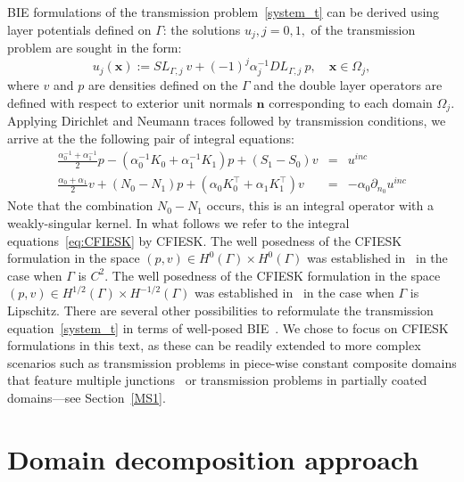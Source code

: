 \documentclass[11pt]{article}
\numberwithin{equation}{section}
\begin{document}
BIE formulations of the transmission problem~\eqref{system_t} can be derived using layer potentials defined on $\Gamma$: the solutions $u_j,j=0,1,$ of the transmission problem are sought in the form:
\begin{equation}\label{eq:layer_t}
  u_j(\mathbf{x}):=SL_{\Gamma,j}\ v+(-1)^j\alpha_j^{-1} DL_{\Gamma,j}\ p,\quad \mathbf{x}\in\Omega_j,
\end{equation}
where $v$ and $p$ are densities defined on the $\Gamma$ and the double layer operators are defined with respect to exterior unit normals $\mathbf{n}$ corresponding to each domain $\Omega_j$. Applying Dirichlet and Neumann traces followed by transmission conditions, we arrive at the the following pair of integral equations:
\begin{equation}\label{eq:CFIESK}
\begin{array}{rcl}
\frac{\alpha_0^{-1}+\alpha_1^{-1}}{2}p -(\alpha_0^{-1}K_0+\alpha_1^{-1}K_1)p + (S_1 - S_0)v&=& \displaystyle u^{inc} \\
  \frac{\alpha_0+\alpha_1}{2}v+(N_0 - N_1)p+ (\alpha_0K_0^\top+\alpha_1K^\top_1)v&=& -\alpha_0\displaystyle \partial_{n_0} u^{inc}
\end{array}
\end{equation}
Note that the combination $N_0-N_1$ occurs, this is an integral operator with a weakly-singular kernel. In what follows we refer to the integral equations~\eqref{eq:CFIESK} by CFIESK. The well posedness of the CFIESK formulation in the space $(p,v)\in H^{0}(\Gamma)\times H^{0}(\Gamma)$ was established in~\cite{KressColton} in the case when $\Gamma$ is $C^2$. The well posedness of the CFIESK formulation in the space $(p,v)\in H^{1/2}(\Gamma)\times H^{-1/2}(\Gamma)$ was established in~\cite{ToWe:1993} in the case when $\Gamma$ is Lipschitz. There are several other possibilities to reformulate the transmission equation~\eqref{system_t} in terms of well-posed BIE~\cite{turc2,dominguez2016well}. We chose to focus on CFIESK formulations in this text, as these can be readily extended to more complex scenarios such as transmission problems in piece-wise constant composite domains that feature multiple junctions~\cite{claeys2015second,greengard1} or transmission problems in partially coated domains---see Section~\ref{MS1}.  


 \section{Domain decomposition approach\label{DDMg}}
\end{document}
